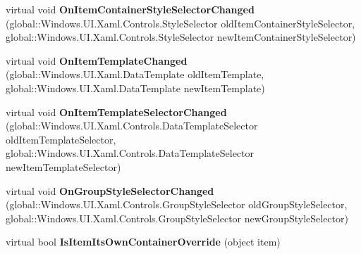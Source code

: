 \begin{DoxyCompactItemize}
\item 
\mbox{\label{class_windows_1_1_u_i_1_1_xaml_1_1_controls_1_1_items_control_ad8e007d53e0d23a9f7110575da6f5432}} 
virtual void {\bfseries On\+Item\+Container\+Style\+Selector\+Changed} (global\+::\+Windows.\+U\+I.\+Xaml.\+Controls.\+Style\+Selector old\+Item\+Container\+Style\+Selector, global\+::\+Windows.\+U\+I.\+Xaml.\+Controls.\+Style\+Selector new\+Item\+Container\+Style\+Selector)
\item 
\mbox{\label{class_windows_1_1_u_i_1_1_xaml_1_1_controls_1_1_items_control_af029f0f8a1bb58b753a65311caf08358}} 
virtual void {\bfseries On\+Item\+Template\+Changed} (global\+::\+Windows.\+U\+I.\+Xaml.\+Data\+Template old\+Item\+Template, global\+::\+Windows.\+U\+I.\+Xaml.\+Data\+Template new\+Item\+Template)
\item 
\mbox{\label{class_windows_1_1_u_i_1_1_xaml_1_1_controls_1_1_items_control_af6a143834a45fdc2422edde6c8dbe3dd}} 
virtual void {\bfseries On\+Item\+Template\+Selector\+Changed} (global\+::\+Windows.\+U\+I.\+Xaml.\+Controls.\+Data\+Template\+Selector old\+Item\+Template\+Selector, global\+::\+Windows.\+U\+I.\+Xaml.\+Controls.\+Data\+Template\+Selector new\+Item\+Template\+Selector)
\item 
\mbox{\label{class_windows_1_1_u_i_1_1_xaml_1_1_controls_1_1_items_control_adea6b7c5dc22e6a94522e632340290be}} 
virtual void {\bfseries On\+Group\+Style\+Selector\+Changed} (global\+::\+Windows.\+U\+I.\+Xaml.\+Controls.\+Group\+Style\+Selector old\+Group\+Style\+Selector, global\+::\+Windows.\+U\+I.\+Xaml.\+Controls.\+Group\+Style\+Selector new\+Group\+Style\+Selector)
\item 
\mbox{\label{class_windows_1_1_u_i_1_1_xaml_1_1_controls_1_1_items_control_af7c44086f992202e12f3559064216061}} 
virtual bool {\bfseries Is\+Item\+Its\+Own\+Container\+Override} (object item)
\item 
\mbox{\label{class_windows_1_1_u_i_1_1_xaml_1_1_controls_1_1_items_control_a77205f1b95f23b7eac70cb06025fade2}} 

\end{DoxyCompactItemize}
